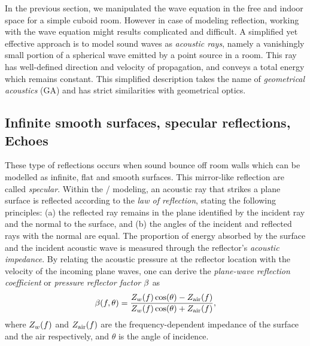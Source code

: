 In the previous section, we manipulated the wave equation in the free and indoor space for a simple cuboid room.
However in case of modeling reflection, working with the wave equation might results complicated and difficult.
A simplified yet effective approach is to model sound waves as \textit{acoustic rays}, namely
a vanishingly small portion of a spherical wave emitted by a point source in a room.
This ray has well-defined direction and velocity of propagation, and conveys a total energy which remains constant.
This simplified description takes the name of \textit{geometrical acoustics} (GA) and has strict similarities with geometrical optics.


\subsection{Infinite smooth surfaces, specular reflections, Echoes}
These type of reflections occurs when sound bounce off room walls which can be modelled as infinite, flat and smooth surfaces.
This mirror-like reflection are called \textit{specular}.
Within the \GA/ modeling, an acoustic ray that strikes a plane surface is reflected according to the \textit{law of reflection}, stating the following principles:
(a) the reflected ray remains in the plane identified by the incident ray and the normal to the surface,
and (b) the angles of the incident and reflected rays with the normal are equal.
The proportion of energy absorbed by the surface and the incident acoustic wave is measured
through the reflector's \textit{acoustic impedance}.
By relating the acoustic pressure at the reflector location with the velocity of the incoming plane waves,
one can derive the \textit{plane-wave reflection coefficient} or \textit{pressure reflector factor} $\beta$ \cite{kuttruff} as
\begin{equation}
    \beta(f, \theta) = \frac{Z_w(f)\cos(\theta) - Z_\text{air}(f)}{Z_w(f)\cos(\theta) + Z_\text{air}(f)}
    ,
\end{equation}
where $Z_w(f)$ and $Z_\text{air}(f)$ are the frequency-dependent impedance of the surface and the air respectively,
and $\theta$ is the angle of incidence.

